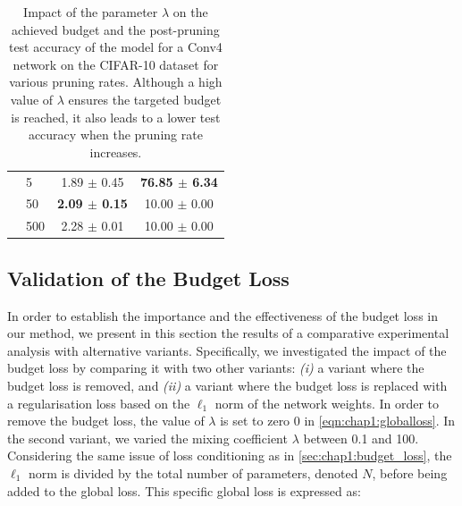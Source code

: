\begin{table}[tbp]
\begin{center}
\begin{tabular}{llcc}
                                 & 5                                          & 1.89 $\pm$ 0.45               & \textbf{76.85 $\pm$ 6.34} \\
                                 & 50                                         & \textbf{2.09 $\pm$ 0.15}      & 10.00 $\pm$ 0.00          \\
                                 & 500                                        & 2.28 $\pm$ 0.01               & 10.00 $\pm$ 0.00          \\
      \bottomrule
    \end{tabular}
  \end{center}
  \caption{
    Impact of the parameter $\lambda$ on the achieved budget and the post-pruning test accuracy of the model for a Conv4 network on the CIFAR-10 dataset
    for various pruning rates. Although a high value of $\lambda$ ensures
    the targeted budget is reached, it also leads to a lower test accuracy when
    the pruning rate increases.}
  \label{tab:chap1:lambda_impact}
\end{table}



\subsection{Validation of the Budget Loss}
\label{sec:chap1:impact_of_budget_loss}


In order to establish the importance and the effectiveness of the budget loss in our
method, we present in this section the results of a comparative experimental
analysis with alternative variants.  Specifically, we investigated the impact of
the budget loss by comparing it with two other variants: \emph{(i)} a variant
where the budget loss is removed, and \emph{(ii)} a variant where the budget
loss is replaced with a regularisation loss based on the $\ell_1$ norm of the
network weights. In order to remove the budget loss, the value of $\lambda$ is set to
zero 0 in \cref{eqn:chap1:globalloss}. In the second variant, we varied the
mixing coefficient $\lambda$ between 0.1 and 100. Considering the same issue of
loss conditioning as in \cref{sec:chap1:budget_loss}, the $\ell_1$ norm is divided
by the total number of parameters, denoted $N$, before being added to the global loss. This
specific global loss is expressed as:

